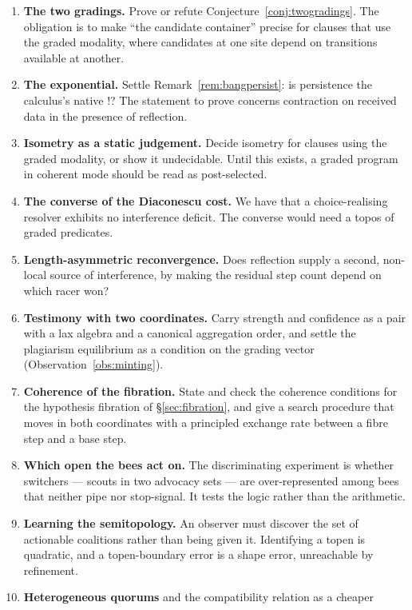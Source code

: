 \begin{enumerate}[label=O\arabic*.,leftmargin=2.6em]
\item \textbf{The two gradings.} Prove or refute Conjecture~\ref{conj:twogradings}.
The obligation is to make ``the candidate container'' precise for clauses that use
the graded modality, where candidates at one site depend on transitions available
at another.
\item \textbf{The exponential.} Settle Remark~\ref{rem:bangpersist}: is persistence
the calculus's native $!$? The statement to prove concerns contraction on received
data in the presence of reflection.
\item \textbf{Isometry as a static judgement.} Decide isometry for clauses using
the graded modality, or show it undecidable. Until this exists, a graded program in
coherent mode should be read as post-selected.
\item \textbf{The converse of the Diaconescu cost.} We have that a choice-realising
resolver exhibits no interference deficit. The converse would need a topos of
graded predicates.
\item \textbf{Length-asymmetric reconvergence.} Does reflection supply a second,
non-local source of interference, by making the residual step count depend on which
racer won?
\item \textbf{Testimony with two coordinates.} Carry strength and confidence as a
pair with a lax algebra and a canonical aggregation order, and settle the
plagiarism equilibrium as a condition on the grading vector
(Observation~\ref{obs:minting}).
\item \textbf{Coherence of the fibration.} State and check the coherence conditions
for the hypothesis fibration of \S\ref{sec:fibration}, and give a search procedure
that moves in both coordinates with a principled exchange rate between a fibre step
and a base step.
\item \textbf{Which open the bees act on.} The discriminating experiment is
whether switchers --- scouts in two advocacy sets --- are over-represented among
bees that neither pipe nor stop-signal. It tests the logic rather than the
arithmetic.
\item \textbf{Learning the semitopology.} An observer must discover the set of
actionable coalitions rather than being given it. Identifying a topen is quadratic,
and a topen-boundary error is a shape error, unreachable by refinement.
\item \textbf{Heterogeneous quorums} and the compatibility relation as a cheaper

\end{enumerate}
